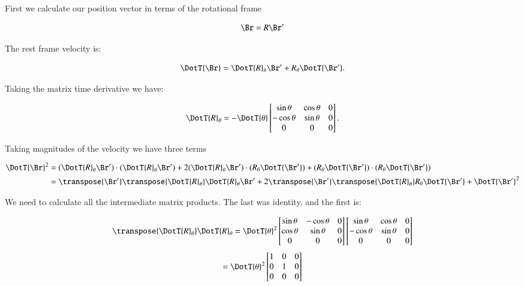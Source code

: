 First we calculate our position vector in terms of the rotational frame

\[
\Br = R\Br'
\]

%

The rest frame velocity is:

\[
\DotT{\Br} = \DotT{R}_{\theta} \Br' + R_{\theta} \DotT{\Br'}.
\]

Taking the matrix time derivative we have:

\[
\DotT{R}_{\theta} =
-\DotT{\theta}
\begin{bmatrix}
\sin \theta & \cos \theta & 0 \\
-\cos \theta & \sin \theta & 0 \\
0 & 0 & 0 \\
\end{bmatrix}.
\]

Taking magnitudes of the velocity we have three terms

\begin{align*}
\DotT{\Br}^2 
&= 
(\DotT{R}_{\theta} \Br') \cdot (\DotT{R}_{\theta} \Br')
+2 (\DotT{R}_{\theta} \Br') \cdot (R_{\theta} \DotT{\Br'})
+(R_{\theta} \DotT{\Br'}) \cdot (R_{\theta} \DotT{\Br'}) \\
&= 
\transpose{\Br'}\transpose{\DotT{R}_{\theta}} \DotT{R}_{\theta} \Br'
+2 \transpose{\Br'} \transpose{\DotT{R}_{\theta}} R_{\theta} \DotT{\Br'}
+\DotT{\Br'}^2 \\
\end{align*}

We need to calculate all the intermediate matrix products.  The last was 
identity, and the first is:

\[
\transpose{\DotT{R}_{\theta}} \DotT{R}_{\theta}
=
{\DotT{\theta}}^2
\begin{bmatrix}
\sin \theta & -\cos \theta & 0 \\
\cos \theta & \sin \theta & 0 \\
0 & 0 & 0 \\
\end{bmatrix}
\begin{bmatrix}
\sin \theta & \cos \theta & 0 \\
-\cos \theta & \sin \theta & 0 \\
0 & 0 & 0 \\
\end{bmatrix}
\]
\[
=
{\DotT{\theta}}^2
\begin{bmatrix}
1 & 0 & 0 \\
0 & 1 & 0 \\
0 & 0 & 0 \\
\end{bmatrix}
\]

